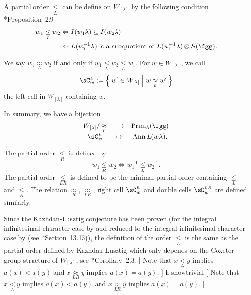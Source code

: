 \documentclass[12pt,a4paper]{amsart}
\newcommand{\trivial}[2][]{\if\relax\detokenize{#1}\relax
  {%
      \color{orange} \vspace{0em} $[$  #2 $]$
      \color{black}
  }
  \else
\ifx#1h
\ifcsname showtrivial\endcsname
{%
    \color{orange} \vspace{0em}  $[$ #2 $]$
    \color{black}
}
\fi
\else {\red Wrong argument!} \fi
\fi
}
\newcommand{\CL}{{\mathcal {L}}}
\newcommand{\CR}{{\mathcal {R}}}
\DeclareMathOperator{\Ann}{Ann}
\numberwithin{equation}{section}
\theoremstyle{remark}
\def\Wlam{W_{[\lambda]}}
\def\CL{{\sC}^{\scriptscriptstyle L}}
\def\CR{{\sC}^{\scriptscriptstyle R}}
\def\CLR{{\sC}^{\scriptscriptstyle LR}}
\def\LC{{}^{\scriptscriptstyle L}\sC}
\def\Prim{\mathrm{Prim}}
\def\Prim{\mathrm{Prim}}
\def\lneqL{\mathrel{\mathop{<}\limits_{\scriptscriptstyle L}}}
\def\leqL{\mathrel{\mathop{\leq}\limits_{\scriptscriptstyle L}}}
\def\leqR{\mathrel{\mathop{\leq}\limits_{\scriptscriptstyle R}}}
\def\leqLR{\mathrel{\mathop{\leq}\limits_{\scriptscriptstyle LR}}}
\def\approxL{\mathrel{\mathop{\approx}\limits_{\scriptscriptstyle L}}}
\def\approxR{\mathrel{\mathop{\approx}\limits_{\scriptscriptstyle R}}}
\def\approxLR{\mathrel{\mathop{\approx}\limits_{\scriptscriptstyle LR}}}
\begin{document}
A partial order $\leqL$ can be define on $W_{[\lambda]}$ by the following condition
\cite{BV2}*{Proposition~2.9}
\begin{equation}\label{eq:leqL}
  \begin{split}
    w_{1} \leqL w_{2} & \Leftrightarrow
    I(w_{1}\lambda)\subseteq I(w_{2}\lambda)\\
    & \Leftrightarrow
    L(w_{2}^{-1}\lambda) \text{ is a subquotient of } L(w_{1}^{-1}\lambda)\otimes S(\fgg).
  \end{split}
\end{equation}

We say $w_{1} \approxL w_{2}$ if and only if $w_{1}\leqL w_{2}\leqL w_{1}$.
For $w\in W_{[\lambda]}$, we call
\[
  \CL_{w} := \Set{ w' \in W_{[\lambda]}| w\approxL w'}
\]
the left cell in $W_{[\lambda]}$ containing $w$.

In summary, we have a bijection
\[
  \begin{array}{ccc}
    W_{[\lambda]}/ \approxL &\longrightarrow & \Prim_{\lambda}(\fgg)\\
    \CL_{w} & \mapsto & \Ann L(w\lambda).
  \end{array}
\]



The partial order $\leqR$ is defined by
\[
  w_{1}\leqR w_{2} \Leftrightarrow w_{1}^{-1} \leqL w_{2}^{-1}.
\]
The partial order $\leqLR$ is defined to be the minimal partial order
containing $\leqL$ and $\leqR$.
The relation $\approxR$, $\approxLR$, right cell $\CR_{
  w}$ and double cells
$\CLR_{w}$ are defined similarly.

Since the Kazhdan-Lusztig conjecture has been proven (for the integral
infinitesimal character case by \cite{BB,BK} and reduced to the integral
infinitesimal character case by \cite{Soergel} (see \cite{H}*{Section~13.13})),
the definition of the order $\leqL$ is the same as the partial order defined by
Kazhdan-Lusztig  \cite{KL} which only depends on the Coxeter group structure of
$W_{[\lambda]}$, see \cite{BV2}*{Corollary~2.3}.
\trivial[]{
  Note that $x\lneqL y$ implies $a(x)<a(y)$
  and $x\approxLR y$ implies $a(x)=a(y)$.
}
\end{document}
